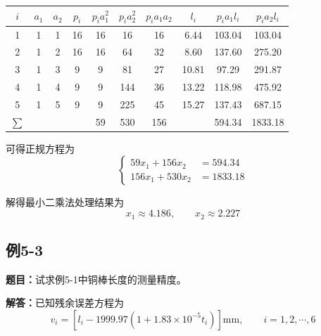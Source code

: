 \documentclass[UTF8,zihao=-4]{ctexart}
\newcommand{\problem}[1]{\subsection*{#1}}
\newcommand{\timu}{\noindent\textbf{题目：}}
\newcommand{\jieda}{\noindent\textbf{解答：}}
\begin{document}
\begin{center}
\scriptsize
\setlength{\tabcolsep}{4pt}
\begin{tabular}{c|c|c|c|c|c|c|c|c|c}
\toprule
$i$ & $a_1$ & $a_2$ & $p_i$ & $p_i a_1^2$ & $p_i a_2^2$ & $p_i a_1a_2$ & $l_i$ & $p_i a_1l_i$ & $p_i a_2l_i$\\
\midrule
1 & 1 & 1 & 16 & 16 & 16 & 16 & 6.44 & 103.04 & 103.04\\
2 & 1 & 2 & 16 & 16 & 64 & 32 & 8.60 & 137.60 & 275.20\\
3 & 1 & 3 & 9 & 9 & 81 & 27 & 10.81 & 97.29 & 291.87\\
4 & 1 & 4 & 9 & 9 & 144 & 36 & 13.22 & 118.98 & 475.92\\
5 & 1 & 5 & 9 & 9 & 225 & 45 & 15.27 & 137.43 & 687.15\\
\midrule
$\sum$ &  &  &  & 59 & 530 & 156 &  & 594.34 & 1833.18\\
\bottomrule
\end{tabular}
\end{center}

可得正规方程为
\begin{equation*}
\left\{
\begin{aligned}
    59x_1+156x_2&=594.34\\
    156x_1+530x_2&=1833.18
\end{aligned}
\right.
\end{equation*}

解得最小二乘法处理结果为
\begin{equation*}
    x_1\approx4.186,
    \qquad
    x_2\approx2.227
\end{equation*}

\problem{例5-3}

\timu 试求例5-1中铜棒长度的测量精度。

\jieda 已知残余误差方程为
\begin{equation*}
    v_i=
    \left[
    l_i-1999.97\left(1+1.83\times10^{-5}t_i\right)
    \right]\mathrm{mm},
    \qquad i=1,2,\cdots,6
\end{equation*}
\end{document}
